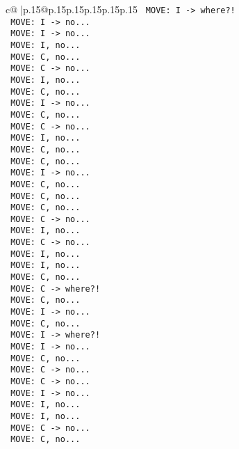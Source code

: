 \documentclass{article}
\begin{document}
{\begin{supertabular}{c@{$\;$}|p{.15\linewidth}@{}p{.15\linewidth}p{.15\linewidth}p{.15\linewidth}p{.15\linewidth}p{.15\linewidth}}
{{{\texttt{ MOVE: I {-}> where?!} \\
\texttt{ MOVE: I {-}> no...} \\
\texttt{ MOVE: I {-}> no...} \\
\texttt{ MOVE: I, no...} \\
\texttt{ MOVE: C, no...} \\
\texttt{ MOVE: C {-}> no...} \\
\texttt{ MOVE: I, no...} \\
\texttt{ MOVE: C, no...} \\
\texttt{ MOVE: I {-}> no...} \\
\texttt{ MOVE: C, no...} \\
\texttt{ MOVE: C {-}> no...} \\
\texttt{ MOVE: I, no...} \\
\texttt{ MOVE: C, no...} \\
\texttt{ MOVE: C, no...} \\
\texttt{ MOVE: I {-}> no...} \\
\texttt{ MOVE: C, no...} \\
\texttt{ MOVE: C, no...} \\
\texttt{ MOVE: C, no...} \\
\texttt{ MOVE: C {-}> no...} \\
\texttt{ MOVE: I, no...} \\
\texttt{ MOVE: C {-}> no...} \\
\texttt{ MOVE: I, no...} \\
\texttt{ MOVE: I, no...} \\
\texttt{ MOVE: C, no...} \\
\texttt{ MOVE: C {-}> where?!} \\
\texttt{ MOVE: C, no...} \\
\texttt{ MOVE: I {-}> no...} \\
\texttt{ MOVE: C, no...} \\
\texttt{ MOVE: I {-}> where?!} \\
\texttt{ MOVE: I {-}> no...} \\
\texttt{ MOVE: C, no...} \\
\texttt{ MOVE: C {-}> no...} \\
\texttt{ MOVE: C {-}> no...} \\
\texttt{ MOVE: I {-}> no...} \\
\texttt{ MOVE: I, no...} \\
\texttt{ MOVE: I, no...} \\
\texttt{ MOVE: C {-}> no...} \\
\texttt{ MOVE: C, no...} \\
}}}
\end{supertabular}}
\end{document}
